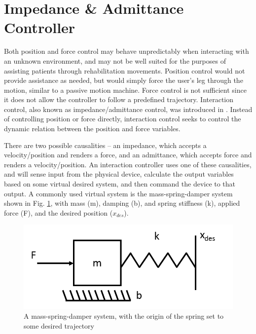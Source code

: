 \documentclass[12pt]{report}
\begin{document}
	
	\section{Impedance \& Admittance Controller} \label{Sec:imp}

%

Both position and force control may behave unpredictably when interacting with an unknown environment, and may not be well suited for the purposes of assisting patients through rehabilitation movements. Position control would not provide assistance as needed, but would simply force the user's leg through the motion, similar to a passive motion machine. Force control is not sufficient since it does not allow the controller to follow a predefined trajectory. Interaction control, also known as impedance/admittance control, was introduced in \cite{Hogan1985}. Instead of controlling position or force directly, interaction control seeks to control the dynamic relation between the position and force variables. 
	
There are two possible causalities -- an impedance, which accepts a velocity/position and renders a force, and an admittance, which accepts force and renders a velocity/position. An interaction controller uses one of these causalities, and will sense input from the physical device, calculate the output variables based on some virtual desired system, and then command the device to that output. A commonly used virtual system is the mass-spring-damper system shown in Fig. \ref{fig:mass-spring-damper}, with mass (m), damping (b), and spring stiffness (k), applied force (F), and the desired position ($x_{des}$). 

	\begin{figure}[h] 
		\centering
		\includegraphics[width=0.5\linewidth]{admittance_sys}
		\caption{A mass-spring-damper system, with the origin of the spring set to some desired trajectory}
		\label{fig:mass-spring-damper}
	\end{figure}
	
\end{document}
